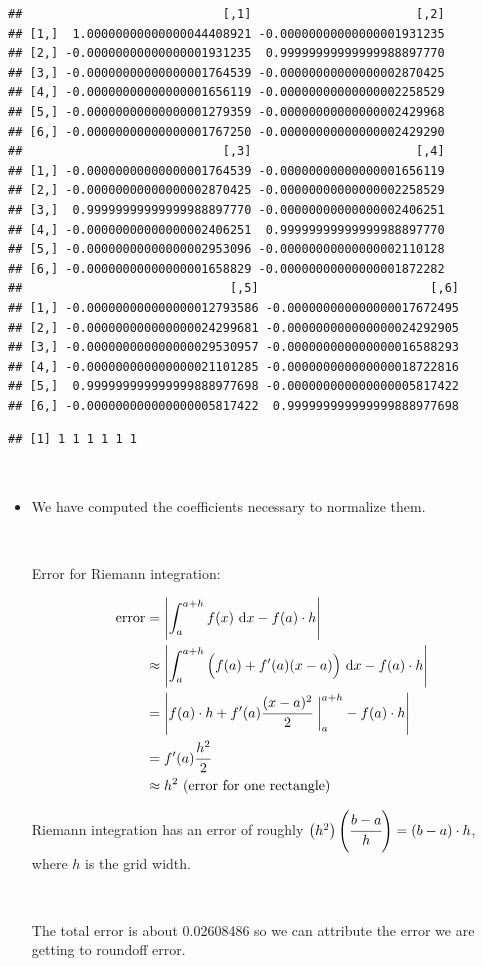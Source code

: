 \documentclass[]{article}
\begin{document}
\begin{verbatim}
##                            [,1]                       [,2]
## [1,]  1.00000000000000044408921 -0.00000000000000001931235
## [2,] -0.00000000000000001931235  0.99999999999999988897770
## [3,] -0.00000000000000001764539 -0.00000000000000002870425
## [4,] -0.00000000000000001656119 -0.00000000000000002258529
## [5,] -0.00000000000000001279359 -0.00000000000000002429968
## [6,] -0.00000000000000001767250 -0.00000000000000002429290
##                            [,3]                       [,4]
## [1,] -0.00000000000000001764539 -0.00000000000000001656119
## [2,] -0.00000000000000002870425 -0.00000000000000002258529
## [3,]  0.99999999999999988897770 -0.00000000000000002406251
## [4,] -0.00000000000000002406251  0.99999999999999988897770
## [5,] -0.00000000000000002953096 -0.00000000000000002110128
## [6,] -0.00000000000000001658829 -0.00000000000000001872282
##                             [,5]                        [,6]
## [1,] -0.000000000000000012793586 -0.000000000000000017672495
## [2,] -0.000000000000000024299681 -0.000000000000000024292905
## [3,] -0.000000000000000029530957 -0.000000000000000016588293
## [4,] -0.000000000000000021101285 -0.000000000000000018722816
## [5,]  0.999999999999999888977698 -0.000000000000000005817422
## [6,] -0.000000000000000005817422  0.999999999999999888977698
\end{verbatim}

\begin{verbatim}
## [1] 1 1 1 1 1 1
\end{verbatim}

~

\begin{itemize} \item[]
We have computed the coefficients necessary to normalize them.

\  


Error for Riemann integration:
 
 \begin{align*}
     \text{error} &= \left| \int_a^{a+h} f(x) \ \text{d}x - f(a)\cdot h \right| \\
     &\approx \left| \int_a^{a+h} \Big( f(a) + f'(a)(x-a) \Big) \ \text{d}x - f(a)\cdot h \right| \\
     &=\left| f(a) \cdot h +  f'(a) \cfrac{(x-a)^2}{2} \  \bigg|_a^{a+h}  - f(a)\cdot h  \right| \\
     &= f'(a)  \cfrac{h^2}{2} \\
     & \approx h^2 \text{ (error for one rectangle) }
 \end{align*}
 
  Riemann integration has an error of roughly $\left(h^2\right) \left(\cfrac{b-a}{h}\right) = (b-a)\cdot h$, where $h$ is the grid width.
  
  \ 
  
  The total error is about 0.02608486 so we can attribute the error we are getting to roundoff error.
\end{itemize}
\end{document}
